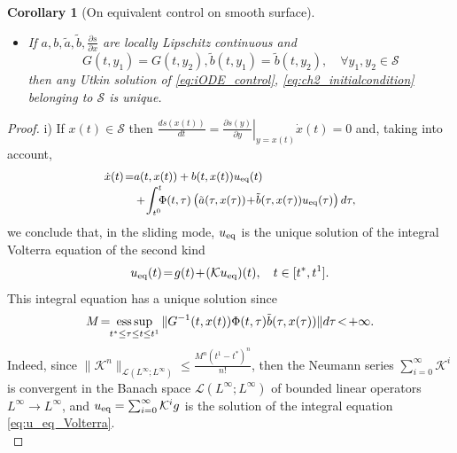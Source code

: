 \documentclass{article}
\newtheorem{corollary}{Corollary}
\DeclareMathOperator*{\esssup}{ess\,sup}
\begin{document}
\begin{corollary}[On equivalent control on smooth surface]
\begin{itemize}
            \item[ii)] If $a,b,\tilde a,\tilde b, \frac{\partial s}{\partial x}$ 
             are locally Lipschitz continuous  and $$G(t,y_1)=G(t,y_2),\tilde b(t,y_1)=\tilde b(t,y_2),  \quad \forall y_1,y_2\in \mathcal{S}$$
            then any Utkin solution of   \eqref{eq:iODE_control}, \eqref{eq:ch2_initialcondition} belonging to $\mathcal{S}$ is unique. 
					\end{itemize} 
	\end{corollary}
\begin{proof}
	i)  If $x(t)\!\in\! \mathcal{S}$ then $\frac{d s(x(t))}{dt}\!=\!\left.\frac{\partial s(y)}{\partial y}\right|_{y=x(t)}\dot x(t)\!=\!0$ and, taking into account,\vspace{-1mm}
		\begin{equation}\label{eq:IDE_affine_SMC_u_eq}\small
	\begin{split}
		\dot x(t)\!=&a(t,x(t))+b(t,x(t))u_{\rm eq}(t)\\[-1mm]
		&+\!\int^t_{t^0}\!\!\!\Phi(t,\tau)\left(\tilde a(\tau,x(\tau))\!+\!\tilde b(\tau,x(\tau))u_{\rm eq}(\tau) \right)d\tau,\vspace{-2mm}
	\end{split}
	\end{equation}
	we conclude that, in the sliding mode, $u_{\rm eq}$ is the unique solution of  
	the integral Volterra equation of the second kind\vspace{-1mm}
	\begin{equation}\label{eq:u_eq_Volterra}\small 
		u_{\rm eq} (t)\!=\!g(t)\!+\!(\mathcal{K}u_{\rm eq})(t), \quad t\in [t^*,t^1].\vspace{-1mm}
	\end{equation}
This integral  equation has a unique solution since \vspace{-1mm}
	 \begin{equation*}\small
M\!=\!\!\esssup_{t^*\leq \tau\leq t\leq t^1}\| G^{-1}(t,x(t))\Phi(t,\tau) \tilde b(\tau,x(\tau))\| d\tau\!<\!+\infty.\vspace{-2mm}
	\end{equation*}
	Indeed, since $\|\mathcal{K}^n\|_{\mathcal{L}(L^{\infty};L^{\infty})}\leq \frac{M^n(t^1-t^*)^n}{n!}$, then  
	the Neumann series $\sum^{\infty}_{i=0}\mathcal{K}^{i}$ is convergent in the  Banach space $\mathcal{L}(L^{\infty};L^{\infty})$ of bounded linear operators $L^{\infty}\to L^{\infty}$, and  $u_{\rm eq}=\sum^{\infty}_{i=0}\mathcal{K}^{i} g$ is the solution of the integral equation \eqref{eq:u_eq_Volterra}.\\

\end{proof}
\end{document}
